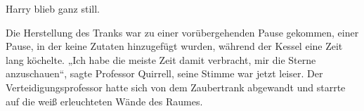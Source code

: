 Harry blieb ganz still.

Die Herstellung des Tranks war zu einer vorübergehenden Pause gekommen, einer Pause, in der keine Zutaten hinzugefügt wurden, während der Kessel eine Zeit lang köchelte.
„Ich habe die meiste Zeit damit verbracht, mir die Sterne anzuschauen“, sagte Professor Quirrell, seine Stimme war jetzt leiser. Der Verteidigungsprofessor hatte sich von dem Zaubertrank abgewandt und starrte auf die weiß erleuchteten Wände des Raumes.
